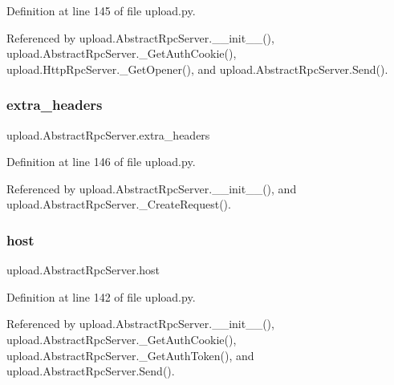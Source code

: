 Definition at line 145 of file upload.\+py.



Referenced by upload.\+Abstract\+Rpc\+Server.\+\_\+\+\_\+init\+\_\+\+\_\+(), upload.\+Abstract\+Rpc\+Server.\+\_\+\+Get\+Auth\+Cookie(), upload.\+Http\+Rpc\+Server.\+\_\+\+Get\+Opener(), and upload.\+Abstract\+Rpc\+Server.\+Send().

\mbox{\label{classupload_1_1AbstractRpcServer_adbbf0109afc13d58d7815fa143cb779f}} 
\subsubsection{\texorpdfstring{extra\+\_\+headers}{extra\_headers}}
{\footnotesize\ttfamily upload.\+Abstract\+Rpc\+Server.\+extra\+\_\+headers}



Definition at line 146 of file upload.\+py.



Referenced by upload.\+Abstract\+Rpc\+Server.\+\_\+\+\_\+init\+\_\+\+\_\+(), and upload.\+Abstract\+Rpc\+Server.\+\_\+\+Create\+Request().

\mbox{\label{classupload_1_1AbstractRpcServer_ab7188d827e2faddcf970f524f5856192}} 
\subsubsection{\texorpdfstring{host}{host}}
{\footnotesize\ttfamily upload.\+Abstract\+Rpc\+Server.\+host}



Definition at line 142 of file upload.\+py.



Referenced by upload.\+Abstract\+Rpc\+Server.\+\_\+\+\_\+init\+\_\+\+\_\+(), upload.\+Abstract\+Rpc\+Server.\+\_\+\+Get\+Auth\+Cookie(), upload.\+Abstract\+Rpc\+Server.\+\_\+\+Get\+Auth\+Token(), and upload.\+Abstract\+Rpc\+Server.\+Send().

\mbox{\label{classupload_1_1AbstractRpcServer_a783a4a7e4ffb776a57a3f267300a213b}} 
